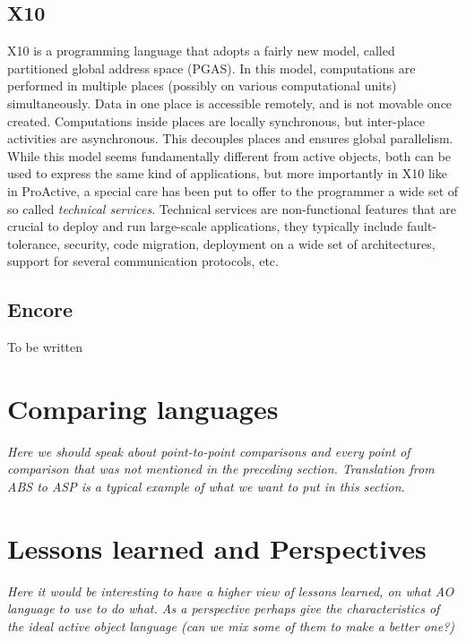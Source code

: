 \subsection{X10} 
X10 \cite{charles2005x10} is a programming language that adopts a
fairly new model, called partitioned global address space (PGAS). In this model,
computations are performed in multiple places (possibly on various computational units)
simultaneously. Data in one place is accessible remotely, and is not movable once
created. Computations inside places are locally synchronous, but inter-place activities
are asynchronous. This decouples places and ensures global parallelism. While this model
seems fundamentally different from active objects, both can be used to express the same
kind of applications, but more importantly in X10 like in ProActive, a special care has
been put to offer to the programmer a wide set of so called \emph{technical services}.
Technical services are non-functional features that are crucial to deploy and run
large-scale applications, they typically include fault-tolerance, security, code
migration, deployment on a wide set of architectures, support for several communication
protocols, etc. 

\subsection{Encore}
To be written


\section{Comparing languages} 

\emph{Here we should speak about point-to-point comparisons and every point of
	comparison that was not mentioned in the preceding section. Translation from ABS to 
	ASP is a typical example of what we want to put in this section.}



\section{Lessons learned and Perspectives}
\emph{Here it would be interesting to have a higher view of lessons learned, on what AO 
language to use to do what. As a perspective perhaps give the characteristics of the 
ideal active object language (can we mix some of them to make a better one?)}